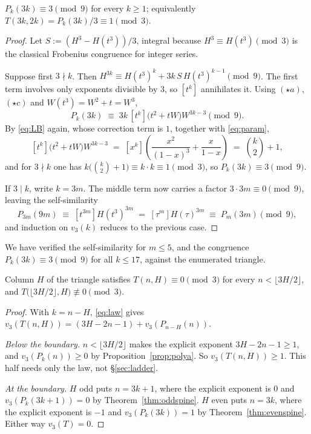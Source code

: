 \documentclass[11pt]{article}
\newcommand{\vthree}{v_3}
\begin{document}
\begin{theorem}
\label{thm:evenspine}
$P_k(3k) \equiv 3 \pmod 9$ for every $k \ge 1$; equivalently
$T(3k,2k) = P_k(3k)/3 \equiv 1 \pmod 3$.
\end{theorem}

\begin{proof}
Let $S := (H^3 - H(t^3))/3$, integral because $H^3 \equiv H(t^3) \pmod 3$ is the
classical Frobenius congruence for integer series.

Suppose first $3 \nmid k$. Then
$H^{3k} \equiv H(t^3)^k + 3k\,S\,H(t^3)^{k-1} \pmod 9$. The first term involves
only exponents divisible by $3$, so $[t^k]$ annihilates it. Using $(\star a)$,
$(\star c)$ and $W(t^3) = W^2 + t = W^3$,
\[
  P_k(3k) \;\equiv\; 3k\,[t^k]\bigl(t^2 + tW\bigr)W^{3k-3} \pmod 9 .
\]
By \eqref{eq:LB} again, whose correction term is $1$, together with
\eqref{eq:param},
\[
  [t^k]\bigl(t^2+tW\bigr)W^{3k-3}
  \;=\; [x^k]\left(\frac{x^2}{(1-x)^3} + \frac{x}{1-x}\right)
  \;=\; \binom{k}{2} + 1 ,
\]
and for $3 \nmid k$ one has
$k\bigl(\binom{k}{2}+1\bigr) \equiv k\cdot k \equiv 1 \pmod 3$, so
$P_k(3k) \equiv 3 \pmod 9$.

If $3 \mid k$, write $k = 3m$. The middle term now carries a factor
$3 \cdot 3m \equiv 0 \pmod 9$, leaving the self-similarity
\[
  P_{3m}(9m) \;\equiv\; [t^{3m}]H(t^3)^{3m}
  \;=\; [\tau^{m}]H(\tau)^{3m} \;\equiv\; P_m(3m) \pmod 9 ,
\]
and induction on $\vthree(k)$ reduces to the previous case.
\end{proof}

We have verified the self-similarity for $m \le 5$, and the congruence
$P_k(3k)\equiv3\pmod 9$ for all $k \le 17$, against the enumerated triangle.

\begin{theorem}
\label{thm:activation}
Column $H$ of the triangle satisfies $T(n,H) \equiv 0 \pmod 3$ for every
$n < \lfloor 3H/2\rfloor$, and $T\bigl(\lfloor 3H/2\rfloor, H\bigr)
\not\equiv 0 \pmod 3$.
\end{theorem}

\begin{proof}
With $k = n - H$, \eqref{eq:law} gives
$\vthree(T(n,H)) = (3H-2n-1) + \vthree(P_{n-H}(n))$.

\emph{Below the boundary.} $n < \lfloor 3H/2\rfloor$ makes the explicit exponent
$3H-2n-1 \ge 1$, and $\vthree(P_k(n)) \ge 0$ by Proposition~\ref{prop:polya}. So
$\vthree(T(n,H)) \ge 1$. This half needs only the law, not \S\ref{sec:ladder}.

\emph{At the boundary.} $H$ odd puts $n = 3k+1$, where the explicit exponent is
$0$ and $\vthree(P_k(3k+1)) = 0$ by Theorem~\ref{thm:oddspine}. $H$ even puts
$n = 3k$, where the explicit exponent is $-1$ and $\vthree(P_k(3k)) = 1$ by
Theorem~\ref{thm:evenspine}. Either way $\vthree(T) = 0$.
\end{proof}
\end{document}
